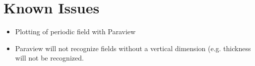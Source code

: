 \chapter{Known Issues}
\label{chap:knownissues}

\begin{itemize}
\item{Plotting of periodic field with Paraview}
\item{Paraview will not recognize fields without a vertical dimension (e.g. thickness will not be recognized.}
\end{itemize}


